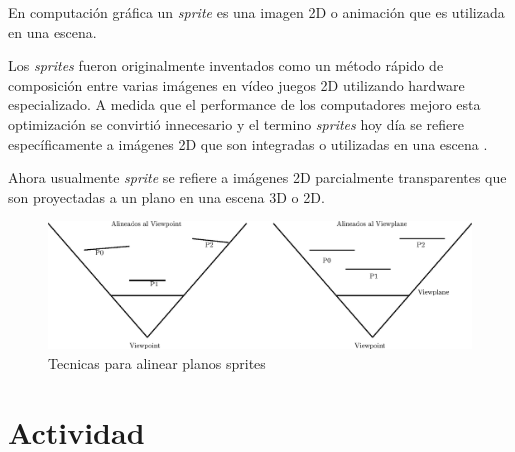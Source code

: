 En computación gráfica un \emph{sprite} es una imagen 2D o animación que es utilizada en una escena.

Los \emph{sprites} fueron originalmente inventados como un método rápido de composición entre varias imágenes en vídeo juegos 2D utilizando hardware especializado. A medida que el performance de los computadores mejoro esta optimización se convirtió innecesario y el termino \emph{sprites} hoy día se refiere específicamente a imágenes 2D que son integradas o utilizadas en una escena \cite{sprites_siggraph}.

Ahora usualmente \emph{sprite} se refiere a imágenes 2D parcialmente transparentes que son proyectadas a un plano en una escena 3D o 2D.~\\[1cm]
\begin{figure}[H]
\centering
\includegraphics[width=0.95\linewidth]{semana3/bills.eps} 
\caption{Tecnicas para alinear planos sprites}
\end{figure}

\section{Actividad}
